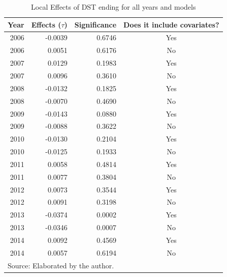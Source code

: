\documentclass[12pt,openright,oneside,a4paper,english,french,spanish]{abntex2}
\numberwithin{table}{section} %
\numberwithin{figure}{section} %
\begin{document}
\begin{otherlanguage}{english}


\begin{table}[H]
\caption{Local Effects of DST ending for all years and models}
\begin{center}
\begin{small}
\begin{tabular}{rrrc}
  \hline
Year & Effects ($\tau$) & Significance & Does it include covariates? \\
  \hline
2006 & -0.0039 & 0.6746 & Yes \\ 
2006 & 0.0051 & 0.6176 & No \\ 
2007 & 0.0129 & 0.1983 & Yes \\ 
2007 & 0.0096 & 0.3610 & No \\ 
2008 & -0.0132 & 0.1825 & Yes \\ 
2008 & -0.0070 & 0.4690 & No \\ 
2009 & -0.0143 & 0.0880 & Yes \\ 
2009 & -0.0088 & 0.3622 & No \\ 
2010 & -0.0130 & 0.2104 & Yes \\ 
2010 & -0.0125 & 0.1933 & No \\ 
2011 & 0.0058 & 0.4814 & Yes \\ 
2011 & 0.0077 & 0.3804 & No \\ 
2012 & 0.0073 & 0.3544 & Yes \\ 
2012 & 0.0091 & 0.3198 & No \\ 
2013 & -0.0374 & 0.0002 & Yes \\ 
2013 & -0.0346 & 0.0007 & No \\ 
2014 & 0.0092 & 0.4569 & Yes \\ 
2014 & 0.0057 & 0.6194 & No \\ 
   \hline
\multicolumn{4}{l}{Source: Elaborated by the author.}
\end{tabular}
\end{small}
\end{center}
\label{tab:resultados_taus_saida_RS}
\end{table}



\end{otherlanguage}
\end{document}

